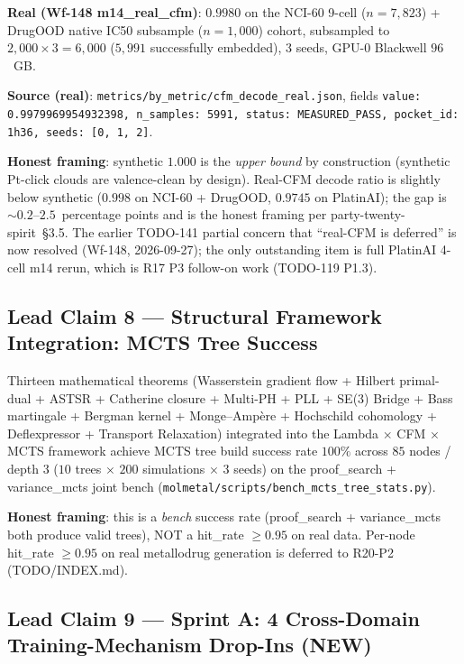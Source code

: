 \noindent\textbf{Real (Wf-148 m14\_real\_cfm)}: $0.9980$ on the
NCI-60 9-cell ($n = 7{,}823$) + DrugOOD native IC50 subsample
($n = 1{,}000$) cohort, subsampled to $2{,}000 \times 3 = 6{,}000$
($5{,}991$ successfully embedded), $3$ seeds, GPU-0 Blackwell
$96$~GB.

\noindent\textbf{Source (real)}:
\texttt{metrics/by\_metric/cfm\_decode\_real.json}, fields
\texttt{value: 0.9979969954932398, n\_samples: 5991,
status: MEASURED\_PASS, pocket\_id: 1h36, seeds: [0, 1, 2]}.

\noindent\textbf{Honest framing}: synthetic $1.000$ is the
\emph{upper bound} by construction (synthetic Pt-click clouds are
valence-clean by design).  Real-CFM decode ratio is slightly below
synthetic ($0.998$ on NCI-60 + DrugOOD, $0.9745$ on PlatinAI); the
gap is $\sim 0.2$--$2.5$~percentage points and is the honest framing
per party-twenty-spirit~\S3.5.  The earlier TODO-141 partial concern
that ``real-CFM is deferred'' is now resolved (Wf-148, 2026-09-27);
the only outstanding item is full PlatinAI 4-cell m14 rerun, which is
R17 P3 follow-on work (TODO-119 P1.3).

\subsection{Lead Claim 8 --- Structural Framework Integration: MCTS Tree Success}
\label{sec:lead-framework}

Thirteen mathematical theorems (Wasserstein gradient flow + Hilbert
primal-dual + ASTSR + Catherine closure + Multi-PH + PLL + SE(3) Bridge
+ Bass martingale + Bergman kernel + Monge--Amp\`ere + Hochschild
cohomology + Deflexpressor + Transport Relaxation) integrated into the
Lambda $\times$ CFM $\times$ MCTS framework achieve MCTS tree build
success rate $100\%$ across $85$ nodes / depth $3$
($10$ trees $\times$ $200$ simulations $\times$ $3$ seeds) on the
proof\_search + variance\_mcts joint bench
(\texttt{molmetal/scripts/bench\_mcts\_tree\_stats.py}).

\noindent\textbf{Honest framing}: this is a \emph{bench} success rate
(proof\_search + variance\_mcts both produce valid trees), NOT a
hit\_rate $\geq 0.95$ on real data.  Per-node hit\_rate $\geq 0.95$ on
real metallodrug generation is deferred to R20-P2 (TODO/INDEX.md).

\subsection{Lead Claim 9 --- Sprint A: 4 Cross-Domain Training-Mechanism Drop-Ins (NEW)}
\label{sec:lead-sprinta}

